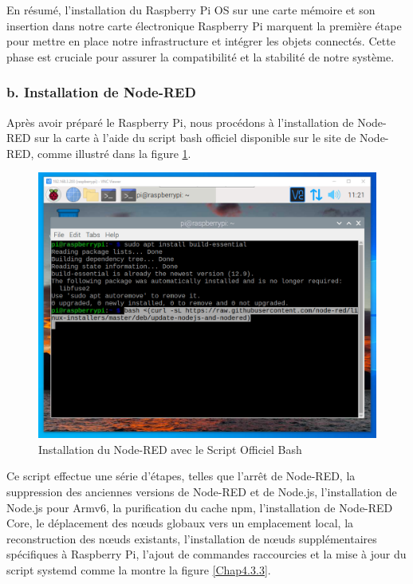 En résumé, l'installation du Raspberry Pi OS sur une carte mémoire et son insertion dans notre carte électronique Raspberry Pi marquent la première étape pour mettre en place notre infrastructure et intégrer les objets connectés. Cette phase est cruciale pour assurer la compatibilité et la stabilité de notre système.


\subsubsection{b. Installation de Node-RED}

Après avoir préparé le Raspberry Pi, nous procédons à l'installation de Node-RED sur la carte à l'aide du script bash officiel disponible sur le site de Node-RED, comme illustré dans la figure \ref{Chap4.3.2}.

\begin{figure}[H]
 \centering
    \includegraphics[width=15cm]{Images/NodeRedInstall1.png}
    \caption{Installation du Node-RED avec le Script Officiel Bash}
    \label{Chap4.3.2}
\end{figure}    

Ce script effectue une série d'étapes, telles que l'arrêt de Node-RED, la suppression des anciennes versions de Node-RED et de Node.js, l'installation de Node.js pour Armv6, la purification du cache npm, l'installation de Node-RED Core, le déplacement des nœuds globaux vers un emplacement local, la reconstruction des nœuds existants, l'installation de nœuds supplémentaires spécifiques à Raspberry Pi, l'ajout de commandes raccourcies et la mise à jour du script systemd comme la montre la figure \ref{Chap4.3.3}.

